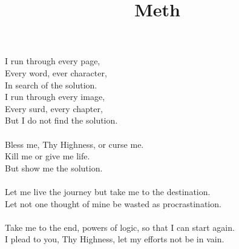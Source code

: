 \documentclass{article}
\title{Meth}
\begin{document}
I run through every page,
\\
Every word, ever character,
\\
In search of the solution.
\\
I run through every image,
\\
Every surd, every chapter,
\\
But I do not find the solution.
\\
\\
Bless me, Thy Highness, or curse me.
\\
Kill me or give me life.
\\
But show me the solution.
\\
\\
Let me live the journey but take me to the destination.
\\
Let not one thought of mine be wasted as procrastination.
\\
\\Take me to the end, powers of logic, so that I can start again.
\\
I plead to you, Thy Highness, let my efforts not be in vain.
\end{document}
